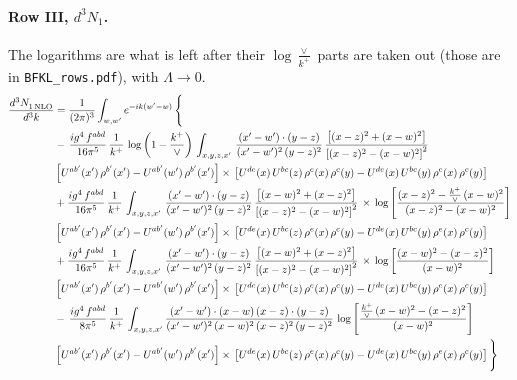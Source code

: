 \documentclass[10pt]{article}
\numberwithin{equation}{section}
\begin{document}
\paragraph{Row III, $d^3N_1$.}
The logarithms are what is left after their $\log\frac{\vee}{k^+}$ parts are taken out (those are in \texttt{BFKL\_rows.pdf}), with $\Lambda\to0$.
\begin{align}
   \frac{d^{3}N_{1\,\rm NLO}^{\rm}}{d^{3}k}  & =  \frac{1}{(2\pi)^{3}}  \int_{w, w^\prime} e^{-ik(w^\prime-w)}\, \Bigg\{\notag \\
& -\,\frac{ig^{4}\,f^{abd}}{16\pi^{5}}\,\frac{1}{k^{+}}\, \log{\left(1-\frac{k^{+}}{\vee}\right)}\,\int_{x,y,z,x'}\, \frac{(x'-w')\cdot (y-z)}{(x'-w')^{2}\,(y-z)^{2}}\,\frac{\left[(x-z)^{2}+(x-w)^{2}\right]}{\left[(x-z)^{2}-(x-w)^{2}\right]^{2}}\notag \\ & \left[U^{ab'}(x')\,\rho^{b'}(x')-U^{ab'}(w')\, \rho^{b'}(x')\right]\times\, \left[U^{de}(x)\,U^{bc}(z)\, \rho^{e}(x)\,\rho^{c}(y)-U^{de}(x)\,U^{bc}(y)\,\rho^{e}(x)\,\rho^{c}(y)\right] \notag \\
&  +\frac{ig^{4}\,f^{abd}}{16\pi^{5}}\, \frac{1}{k^{+}}\,\int_{x,y,z,x'}\, \frac{(x'-w')\cdot (y-z)}{(x'-w')^{2}\,(y-z)^{2}}\, \frac{\left[(x-w)^{2}+(x-z)^{2}\right]}{\left[(x-z)^{2}-(x-w)^{2}\right]^{2}}\, \times\, \log{\left[\frac{(x-z)^{2}-\frac{k^{+}}{\vee}\,(x-w)^{2}}{(x-z)^{2}-(x-w)^{2}}\right]}\notag \\ & \left[U^{ab'}(x')\,\rho^{b'}(x')-U^{ab'}(w')\, \rho^{b'}(x')\right]\times\, \left[U^{de}(x)\,U^{bc}(z)\, \rho^{e}(x)\,\rho^{c}(y)-U^{de}(x)\,U^{bc}(y)\,\rho^{e}(x)\,\rho^{c}(y)\right] \notag \\
&   +\frac{ig^{4}\,f^{abd}}{16\pi^{5}}\, \frac{1}{k^{+}}\,\int_{x,y,z,x'}\, \frac{(x'-w')\cdot (y-z)}{(x'-w')^{2}\,(y-z)^{2}}\, \frac{\left[(x-w)^{2}+(x-z)^{2}\right]}{\left[(x-z)^{2}-(x-w)^{2}\right]^{2}}\, \times\, \log{\left[\frac{(x-w)^{2}-(x-z)^{2}}{(x-w)^{2}}\right]}\notag \\ & \left[U^{ab'}(x')\,\rho^{b'}(x')-U^{ab'}(w')\, \rho^{b'}(x')\right]\times\, \left[U^{de}(x)\,U^{bc}(z)\, \rho^{e}(x)\,\rho^{c}(y)-U^{de}(x)\,U^{bc}(y)\,\rho^{e}(x)\,\rho^{c}(y)\right] \notag \\
& -\, \frac{ig^{4}\,f^{abd}}{8\pi^{5}}\,\frac{1}{k^{+}}\,\int_{x,y,z,x'}\frac{(x'-w')\cdot (x-w)\, (x-z)\cdot (y-z)}{(x'-w')^{2}\, (x-w)^{2}\, (x-z)^{2}\, (y-z)^{2}}\,\log{\left[\frac{\frac{k^{+}}{\vee}\,(x-w)^{2}-(x-z)^{2}}{(x-w)^{2}}\right]} \notag \\ & \left[U^{ab'}(x')\,\rho^{b'}(x')-U^{ab'}(w')\, \rho^{b'}(x')\right]\times\, \left[U^{de}(x)\,U^{bc}(z)\, \rho^{e}(x)\,\rho^{c}(y)-U^{de}(x)\,U^{bc}(y)\,\rho^{e}(x)\,\rho^{c}(y)\right]\Bigg\} \label{eq:R:G1IIIN1}
\end{align}
\end{document}

